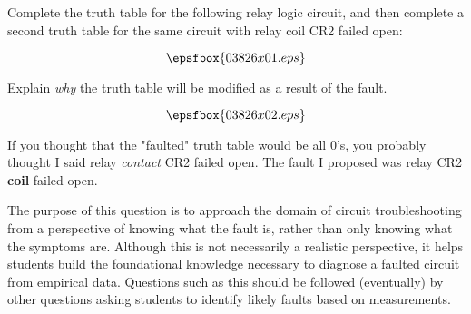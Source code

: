 

Complete the truth table for the following relay logic circuit, and then complete a second truth table for the same circuit with relay coil CR2 failed open:

$$\epsfbox{03826x01.eps}$$

Explain {\it why} the truth table will be modified as a result of the fault.







$$\epsfbox{03826x02.eps}$$

If you thought that the "faulted" truth table would be all 0's, you probably thought I said relay {\it contact} CR2 failed open.  The fault I proposed was relay CR2 {\bf coil} failed open.







The purpose of this question is to approach the domain of circuit troubleshooting from a perspective of knowing what the fault is, rather than only knowing what the symptoms are.  Although this is not necessarily a realistic perspective, it helps students build the foundational knowledge necessary to diagnose a faulted circuit from empirical data.  Questions such as this should be followed (eventually) by other questions asking students to identify likely faults based on measurements.




